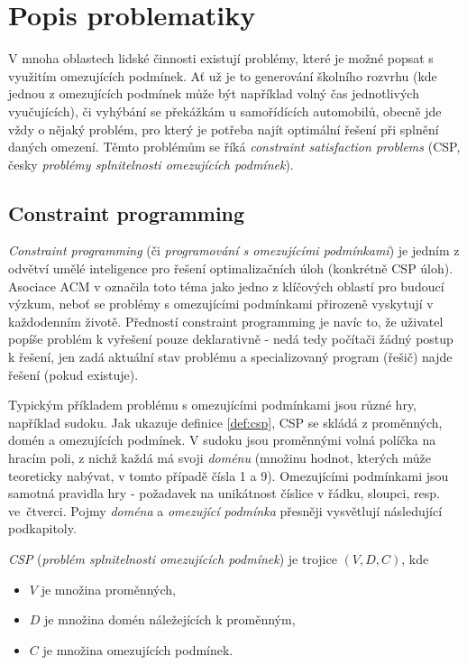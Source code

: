 \chapter{Popis problematiky}
V mnoha oblastech lidské činnosti existují problémy, které je možné popsat s využitím omezujících podmínek. Ať už je to generování školního rozvrhu (kde jednou z omezujících podmínek může být například volný čas jednotlivých vyučujících), či vyhýbání se překážkám u samořídících automobilů, obecně jde vždy o nějaký problém, pro který je potřeba najít optimální řešení při splnění daných omezení. Těmto problémům se říká \emph{constraint satisfaction problems} (CSP, česky \emph{problémy splnitelnosti omezujících podmínek}).

\section{Constraint programming}
\emph{Constraint programming} (či \emph{programování s omezujícími podmínkami}) je jedním z odvětví umělé inteligence pro řešení optimalizačních úloh (konkrétně CSP úloh). Asociace ACM v \cite{Wegner1996} označila toto téma jako jedno z klíčových oblastí pro budoucí výzkum, neboť se problémy s omezujícími podmínkami přirozeně vyskytují v každodenním životě. Předností constraint programming je navíc to, že uživatel popíše problém k vyřešení pouze deklarativně - nedá tedy počítači žádný postup k řešení, jen zadá aktuální stav problému a specializovaný program (řešič) najde řešení (pokud existuje).

Typickým příkladem problému s omezujícími podmínkami jsou různé hry, například sudoku. Jak ukazuje definice \ref{def:csp}, CSP se skládá z proměnných, domén a omezujících podmínek. V sudoku jsou proměnnými volná políčka na hracím poli, z nichž každá má svoji \emph{doménu} (množinu hodnot, kterých může teoreticky nabývat, v tomto případě čísla 1 a 9). Omezujícími podmínkami jsou samotná pravidla hry - požadavek na unikátnost číslice v řádku, sloupci, resp. ve~čtverci. Pojmy \emph{doména} a \emph{omezující podmínka} přesněji vysvětlují následující podkapitoly.

\begin{definition}
\label{def:csp}
\emph{CSP} (\emph{problém splnitelnosti omezujících podmínek}) je trojice $(V, D, C)$, kde
\begin{itemize}
  \item $V$ je množina proměnných,
  \item $D$ je množina domén náležejících k proměnným,
  \item $C$ je množina omezujících podmínek.
\end{itemize}
\end{definition}

